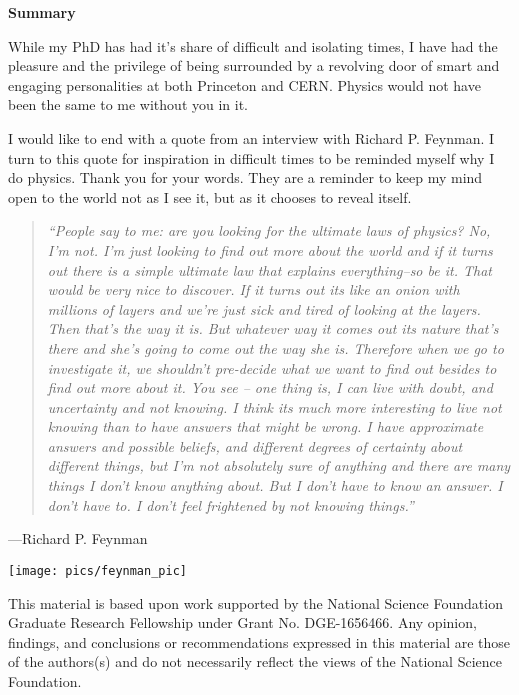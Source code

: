 \begin{center} \textbf{Summary} \end{center}

While my PhD has had it's share of difficult and isolating times, I have had the pleasure and
the privilege of being surrounded by a revolving door of smart and engaging personalities at both Princeton and CERN. Physics would not have been the same to me without
you in it.

I would like to end with a quote from an interview with Richard P. Feynman. 
I turn to this quote for inspiration in difficult times to be reminded myself
 why I do physics. Thank you for your words. They are a reminder to keep
my mind open to the world not as I see it, but as it chooses to reveal itself. 

\begin{quote} 
\textit{``People say to me: are you looking for the ultimate laws of physics? No, I'm not. I'm just looking to find
out more about the world and if it turns out there is a simple ultimate law that explains everything--so be it. That would be very nice to discover. 
If it turns out its like an onion with millions of layers and we're just sick and tired of looking at the layers.
Then that's the way it is. But whatever way it comes out its nature that's there and she's going to come out the way she is. 
Therefore when we go to investigate it, we shouldn't pre-decide what we want to find out besides to find
out more about it.  You see -- one thing is, I can live with doubt, and uncertainty 
and not knowing. I think its much more interesting to live not knowing than to have answers that might be wrong. 
I have approximate answers and possible beliefs, and different degrees of certainty about different things, but I'm
not absolutely sure of anything and there are many things I don't know anything about. 
But I don't have to know an answer. I don't have to. I don't feel frightened by not knowing things.''}
\end{quote}
\begin{center} ---Richard P. Feynman \end{center}
\begin{center}
\texttt{[image: pics/feynman\_pic]}
\end{center}


\newpage

This material is based upon work supported by the National Science Foundation Graduate Research Fellowship
 under Grant No. DGE-1656466. Any opinion, findings, and conclusions or recommendations expressed in this material are those of the authors(s) and do not necessarily reflect the views of the National Science Foundation.


